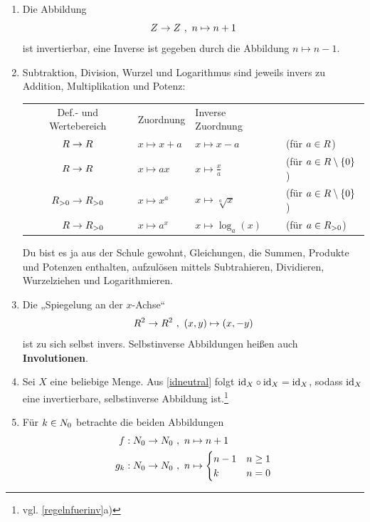 \begin{bsp} \label{bsp:umkehrabb} \qquad
    \begin{enumerate}
        \item Die Abbildung
            \[ \relax Z\to \relax Z \ ,\ n\mapsto n+1 \]
        ist invertierbar, eine Inverse ist gegeben durch die Abbildung $n\mapsto n-1$.
        \item Subtraktion, Division, Wurzel und Logarithmus sind jeweils invers zu Addition, Multiplikation und Potenz:
        \begin{center}
        \begin{tabular}{clll}
            Def.- und Wertebereich & Zuordnung & Inverse Zuordnung & \phantom{Platzhalter}\\
            \cmidrule{1-3}
            $\relax R\to \relax R$ & $x\mapsto x+a$ & $x\mapsto x-a$ & (für $a\in \relax R$)\\
            $\relax R\to \relax R$ & $x\mapsto ax$ & $x\mapsto \frac{x}{a}$ & (für $a\in \relax R\setminus \{0\}$) \\
            $\relax R_{>0} \to \relax R_{>0}$ & $x\mapsto x^a$ & $x\mapsto \sqrt[a]{x}$ & (für $a\in \relax R\setminus \{0\}$) \\
            $\phantom{\R_{>0} \to \R_{>0}}\makebox[0pt][r]{$\R \to \R_{>0}$}$ & $x \mapsto a^x$ & $x \mapsto \log_a(x)$ & (für $a\in \relax R_{>0}$)
        \end{tabular}
        \end{center}
        Du bist es ja aus der Schule gewohnt, Gleichungen, die Summen, Produkte und Potenzen enthalten, aufzulösen mittels Subtrahieren, Dividieren, Wurzelziehen und Logarithmieren.
        \item Die „Spiegelung an der $x$-Achse“
        \[ \relax R^2 \to \relax R^2 \ ,\ (x,y) \mapsto (x,-y) \]
        ist zu sich selbst invers. Selbstinverse Abbildungen heißen auch \textbf{Involutionen}.
        \item Sei $X$ eine beliebige Menge. Aus \cref{idneutral} folgt $\mathrm{id}_X\circ \mathrm{id}_X=\mathrm{id}_X$, sodass $\mathrm{id}_X$ eine invertierbare, selbstinverse Abbildung ist.\footnote{vgl. \cref{regelnfuerinv}a)}
        \item Für $k\in \relax N_0$ betrachte die beiden Abbildungen
        \begin{align*}
            f:\N_0 \to \N_0 \ &,\ n \mapsto n+1 \\
            g_k: \N_0 \to \N_0\ &,\ n \mapsto \begin{cases}
                n-1 & n\ge 1 \\
                k & n=0
            \end{cases}

\end{align*}
\end{enumerate}
\end{bsp}
